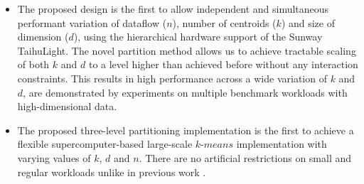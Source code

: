 \documentclass[10pt,journal,compsoc]{IEEEtran}
\begin{document}
\begin{itemize}

\item The proposed design is the first to allow independent and simultaneous performant  variation of dataflow ($n$), number of centroids ($k$) and size of dimension ($d$), using the hierarchical hardware support of the Sunway TaihuLight. The novel partition method allows us to achieve tractable scaling of both $k$ and $d$ to a level higher than achieved before without any interaction constraints. This results in high performance across a wide variation of $k$ and $d$,  are demonstrated by experiments on multiple benchmark workloads with high-dimensional data. 




\item The proposed three-level partitioning implementation is the first to achieve a flexible supercomputer-based large-scale $k$-$means$ implementation with varying values of $k$, $d$ and $n$. There are no artificial restrictions on small and regular workloads unlike in previous work \cite{bender2015k}.


\end{itemize}
\end{document}
